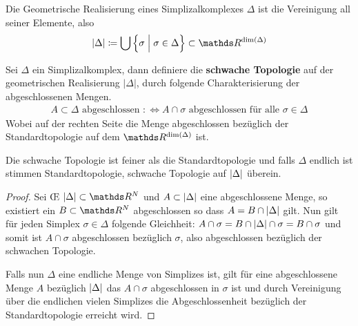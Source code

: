 


\begin{Def}
	Die Geometrische Realisierung eines Simplizalkomplexes $\Delta$ ist
	die Vereinigung all seiner Elemente, also
	\begin{gather*}
	|\Delta| \coloneqq \bigcup \left\{ \sigma \; \Big| \; \sigma \in
	\Delta \right\} \subset \R^{\dim(\Delta)}
	\end{gather*}
\end{Def}

\begin{Def}
	Sei $\Delta$ ein Simplizalkomplex, dann definiere die
	\textbf{schwache Topologie} auf der geometrischen Realisierung $| \Delta |$,
	durch folgende Charakterisierung der abgeschlossenen Mengen.
	\begin{gather*}
	A \subset \Delta \text{ abgeschlossen } :\Leftrightarrow A \cap
	\sigma \text{ abgeschlossen für alle } \sigma \in \Delta
	\end{gather*}
	Wobei auf der rechten Seite die Menge abgeschlossen bezüglich der
	Standardtopologie auf dem $\R^{\dim(\Delta)}$ ist.
\end{Def}

\begin{Lem}
	Die schwache Topologie ist feiner als die Standardtopologie und
	falls $\Delta$ endlich ist stimmen Standardtopologie, schwache
	Topologie auf $\left| \Delta \right|$ überein.
	\begin{proof}
		Sei \OE\; $\gr{\Delta} \subset \R^N$ und $A \subset \left| \Delta \right|$
		eine abgeschlossene Menge, so existiert ein $B \subset \R^N$
		abgeschlossen so dass $A = B \cap \left| \Delta \right|$ gilt. Nun gilt für
		jeden Simplex $\sigma \in \Delta$ folgende Gleichheit:
		$A \cap \sigma = B \cap \left| \Delta \right| \cap \sigma = B \cap \sigma$
		und somit ist $A \cap \sigma$ abgeschlossen bezüglich $\sigma$,
		also abgeschlossen bezüglich der schwachen Topologie.
		
		Falls nun $\Delta$ eine endliche Menge von Simplizes ist, gilt für
		eine abgeschlossene Menge $A$ bezüglich $\left| \Delta \right|$ das
		$A \cap \sigma$ abgeschlossen in $\sigma$ ist und durch
		Vereinigung über die endlichen vielen Simplizes die
		Abgeschlossenheit bezüglich der Standardtopologie erreicht wird.
	\end{proof}
\end{Lem}

